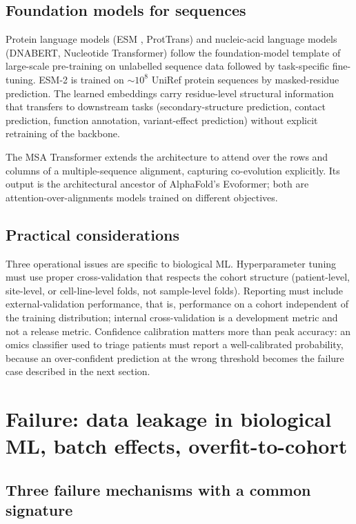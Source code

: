 \subsection{Foundation models for sequences}

Protein language models (ESM \cite{paper:v6c11-lin-esm2-2023}, ProtTrans)
and nucleic-acid language models (DNABERT, Nucleotide Transformer)
follow the foundation-model template of large-scale pre-training on
unlabelled sequence data followed by task-specific fine-tuning. ESM-2
is trained on $\sim 10^{8}$ UniRef protein sequences by masked-residue
prediction. The learned embeddings carry residue-level structural
information that transfers to downstream tasks (secondary-structure
prediction, contact prediction, function annotation, variant-effect
prediction) without explicit retraining of the backbone.

The MSA Transformer \cite{paper:v6c11-rao-msa-transformer-2021}
extends the architecture to attend over the rows and columns of a
multiple-sequence alignment, capturing co-evolution explicitly. Its
output is the architectural ancestor of AlphaFold's Evoformer; both
are attention-over-alignments models trained on different objectives.

\subsection{Practical considerations}

Three operational issues are specific to biological ML. Hyperparameter
tuning must use proper cross-validation that respects the cohort
structure (patient-level, site-level, or cell-line-level folds, not
sample-level folds). Reporting must include external-validation
performance, that is, performance on a cohort independent of the
training distribution; internal cross-validation is a development
metric and not a release metric. Confidence calibration matters more
than peak accuracy: an omics classifier used to triage patients must
report a well-calibrated probability, because an over-confident
prediction at the wrong threshold becomes the failure case described
in the next section.

\section{Failure: data leakage in biological ML, batch effects, overfit-to-cohort}

\subsection{Three failure mechanisms with a common signature}


